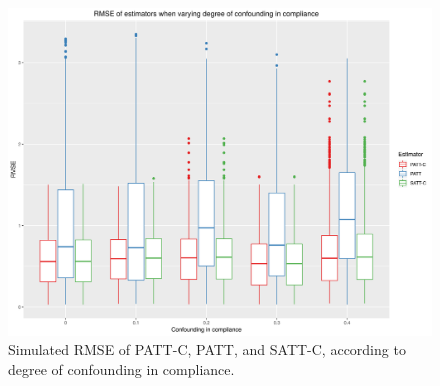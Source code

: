\documentclass[hidelinks,12pt]{article}
\begin{document}
\pagebreak

\printbibliography


\pagebreak
\begin{appendices}
	
\newcommand{\hbAppendixPrefix}{A}
%
\renewcommand{\thefigure}{\hbAppendixPrefix\arabic{figure}}
\setcounter{figure}{0}
\renewcommand{\thetable}{\hbAppendixPrefix\arabic{table}} 
\setcounter{table}{0}
\renewcommand{\theequation}{\hbAppendixPrefix\arabic{equation}} 
\setcounter{equation}{0}

\begin{figure}[htbp]
	\begin{center}
		\includegraphics[width = 1\textwidth]{rmse_boxplots_RateConC}
		\caption{Simulated RMSE of PATT-C, PATT, and SATT-C, according to degree of confounding in compliance.\label{fig:rmse_boxplots_RateConC}}
	\end{center}
\end{figure}


\end{appendices}
\end{document}
